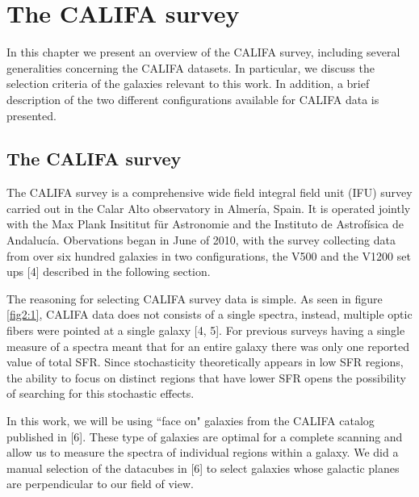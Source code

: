 \chapter{The CALIFA survey}

In this chapter we present an overview of the CALIFA survey, including several generalities concerning the CALIFA datasets. In
particular, we discuss the selection criteria of the galaxies relevant to this work. In addition,
 a brief description of the two different configurations available for CALIFA data is presented.

\section{The CALIFA survey}

The CALIFA survey is a comprehensive wide field  integral field unit (IFU) survey carried out in the Calar Alto observatory in
Almer\'ia, Spain. It is operated jointly with the Max Plank Insititut f\"{u}r Astronomie and the Instituto de Astrof\'isica de
Andaluc\'ia. Obervations began in June of 2010, with the survey collecting data from over six hundred galaxies in two configurations,
the V500 and the V1200 set ups [4] described in the following section.


The reasoning for selecting CALIFA survey data is simple. As seen in figure \ref{fig2:1}, CALIFA data does not consists of a single
spectra, instead, multiple optic fibers were pointed at a single galaxy [4, 5]. For previous surveys having a single measure of a
spectra meant that for an entire galaxy there was only one reported value of total SFR. Since stochasticity theoretically appears
in low SFR regions, the ability to focus on distinct regions that have lower SFR opens the possibility of searching for this
stochastic effects.

In this work, we will be using ``face on" galaxies from the CALIFA catalog published in [6]. These type of galaxies are optimal
for a complete scanning and allow us to measure the spectra of individual regions within a galaxy.
We did a manual selection of the datacubes in [6] to select galaxies whose galactic planes are
perpendicular to our field of view.

